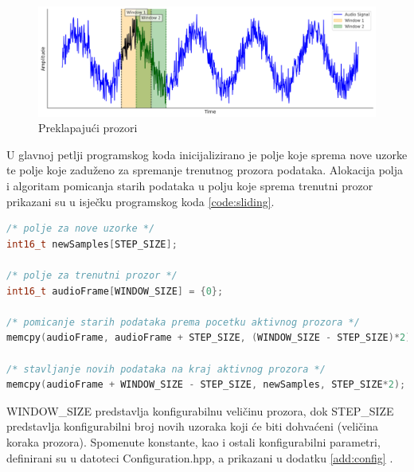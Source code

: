 \begin{figure}[htb]
    \centering
    \includegraphics[width=1\linewidth]{Chapters/struktura_sustava/generiranje_znacajki/sliding.png} 
    \caption{Preklapajući prozori}
    \label{pic:sliding}
\end{figure}

U glavnoj petlji programskog koda inicijalizirano je polje koje sprema nove uzorke te 
polje koje zaduženo za spremanje trenutnog prozora podataka. Alokacija polja i algoritam
pomicanja starih podataka u polju koje sprema trenutni prozor prikazani su u isječku programskog
koda \ref{code:sliding}.

\begin{lstlisting}[language=C++, caption=Algoritam za korištenje novodohvaćenih podataka, label=code:sliding]
/* polje za nove uzorke */
int16_t newSamples[STEP_SIZE];

/* polje za trenutni prozor */
int16_t audioFrame[WINDOW_SIZE] = {0};

/* pomicanje starih podataka prema pocetku aktivnog prozora */
memcpy(audioFrame, audioFrame + STEP_SIZE, (WINDOW_SIZE - STEP_SIZE)*2);

/* stavljanje novih podataka na kraj aktivnog prozora */
memcpy(audioFrame + WINDOW_SIZE - STEP_SIZE, newSamples, STEP_SIZE*2);
\end{lstlisting}

WINDOW\_SIZE predstavlja konfigurabilnu veličinu prozora, dok STEP\_SIZE predstavlja 
konfigurabilni broj novih uzoraka koji će biti dohvaćeni (veličina koraka prozora).
Spomenute konstante, kao i ostali konfigurabilni parametri, definirani su u 
datoteci Configuration.hpp, a prikazani u dodatku \ref{add:config} .

